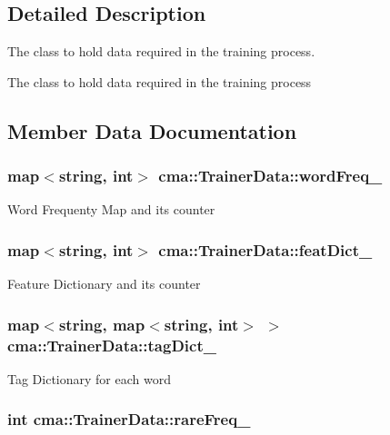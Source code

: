 \subsection{Detailed Description}
The class to hold data required in the training process. 

The class to hold data required in the training process 

\subsection{Member Data Documentation}
\subsubsection{\setlength{\rightskip}{0pt plus 5cm}map$<$string, int$>$ {\bf cma::TrainerData::wordFreq\_\-}}\label{classcma_1_1TrainerData_1d9d4c16f23c5885d8dfa8c4989be181}


Word Frequenty Map and its counter 
\subsubsection{\setlength{\rightskip}{0pt plus 5cm}map$<$string, int$>$ {\bf cma::TrainerData::featDict\_\-}}\label{classcma_1_1TrainerData_565db4b9101b4c17c9a6f8530a19d2f6}


Feature Dictionary and its counter 
\subsubsection{\setlength{\rightskip}{0pt plus 5cm}map$<$string, map$<$string, int$>$ $>$ {\bf cma::TrainerData::tagDict\_\-}}\label{classcma_1_1TrainerData_9ecba8810e62c9a6bfb7446264654a28}


Tag Dictionary for each word 
\subsubsection{\setlength{\rightskip}{0pt plus 5cm}int {\bf cma::TrainerData::rareFreq\_\-}}\label{classcma_1_1TrainerData_c13b7242d3736c2d40772d093fc91a18}



